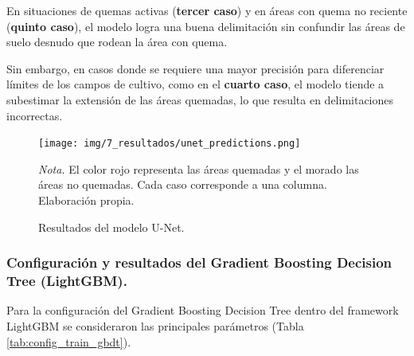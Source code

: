 En situaciones de quemas activas (\textbf{tercer caso}) y en áreas con quema no reciente (\textbf{quinto caso}), el modelo logra 
una buena delimitación sin confundir las áreas de suelo desnudo que rodean la área con quema.

Sin embargo, en casos donde se requiere una mayor precisión para diferenciar límites de los campos de cultivo, como en el \textbf{cuarto caso}, 
el modelo tiende a subestimar la extensión de las áreas quemadas, lo que resulta en delimitaciones incorrectas.

\begin{figure}[H]
    \centering
    \caption{Resultados del modelo U-Net.}
    \label{fig:unet_resultados}
    \texttt{[image: img/7\_resultados/unet\_predictions.png]}
    \begin{flushleft}
        \vspace{-\baselineskip}
        \textit{Nota.} El color rojo representa las áreas quemadas y el morado las áreas no quemadas. Cada caso corresponde a una columna. Elaboración propia.
        \vspace{-\baselineskip}
    \end{flushleft}
\end{figure}

\subsubsection{Configuración y resultados del Gradient Boosting Decision Tree (LightGBM).}
Para la configuración del Gradient Boosting Decision Tree dentro del framework LightGBM se consideraron las principales parámetros 
(Tabla \ref{tab:config_train_gbdt}).

